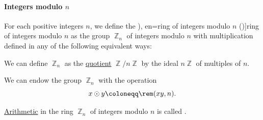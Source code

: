 \paragraph{Integers modulo \( n \)}

\begin{definition}\label{def:ring_of_integers_modulo}
  For each positive integers \( n \), we define the \term[ru=кольцо вычетов по модулю (\cite[30]{Винберг2014КурсАлгебры}), en=ring of integers modulo \( n \) (\cite[112]{Bourbaki1998Algebra1to3})]{ring of integers modulo} \( n \) as the group \hyperref[def:group_of_integers_modulo]{\( \BbbZ_n \)} of integers modulo \( n \) with multiplication defined in any of the following equivalent ways:

  \begin{thmenum}
     We can define \( \BbbZ_n \) as the \hyperref[def:ring/quotient]{quotient} \( \BbbZ / n \BbbZ \) by the ideal \( n \BbbZ \) of multiples of \( n \).

    \mimprovised We can endow the group \( \BbbZ_n \) with the operation
    \begin{equation*}
      x \odot y \coloneqq \rem(xy, n).
    \end{equation*}
  \end{thmenum}
\end{definition}

\begin{concept}\label{con:modular_arithmetic}
  \hyperref[con:arithmetic]{Arithmetic} in the ring \hyperref[def:ring_of_integers_modulo]{\( \BbbZ_n \)} of integers modulo \( n \) is called .
\end{concept}

